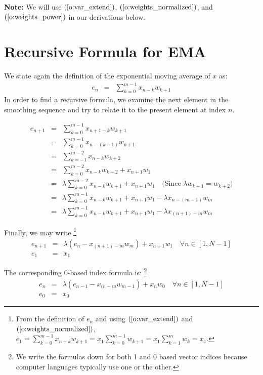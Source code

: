 \documentclass{article}
\begin{document}
{\bf Note:\/} We will use $(\ref{o:var_extend})$, $(\ref{o:weights_normalized})$,
and $(\ref{o:weights_power})$ in our derivations below.

\section{Recursive Formula for EMA}
We state again the definition of the exponential moving average of $x$ as:
\begin{eqnarray}
    e_n &=& \sum_{k=0}^{m-1} x_{n-k} w_{k+1} 
\end{eqnarray}
In order to find a recursive formula, we examine the next element in the smoothing sequence 
and try to relate it to the present element at index $n$.

\begin{eqnarray*}
    e_{n+1} &=&  \sum_{k=0}^{m-1} x_{n+1-k} w_{k+1} \\
        &=&  \sum_{k=0}^{m-1} x_{n-(k-1)} w_{k+1} \\
        &=&  \sum_{k=-1}^{m-2} x_{n-k} w_{k+2}  \\
        &=&  \sum_{k=0}^{m-2} x_{n-k} w_{k+2}  + x_{n+1} w_1 \\
        &=&  \lambda \sum_{k=0}^{m-2} x_{n-k} w_{k+1}  + x_{n+1} w_1  \quad \text{(Since $\lambda w_{k+1} = w_{k+2}$)} \\
        &=&  \lambda \sum_{k=0}^{m-1} x_{n-k} w_{k+1}  + x_{n+1} w_1  
                - \lambda x_{n-(m-1)} w_m  \\
        &=&  \lambda \sum_{k=0}^{m-1} x_{n-k} w_{k+1}  + x_{n+1} w_1  
                - \lambda x_{(n+1)-m} w_m  
\end{eqnarray*}

Finally, we may write%
\footnote{From the definition of $e_n$ and using 
$(\ref{o:var_extend})$ and $(\ref{o:weights_normalized})$,
$e_1 = \sum_{k=0}^{m-1} x_{n-k} w_{k+1} = x_1 \sum_{k=0}^{m-1} w_{k+1} = x_1 \sum_{k=1}^m w_k = x_1$.}
\begin{eqnarray}
    e_{n+1} &=&  \lambda \left(e_n - x_{(n+1) - m} w_m \right) + x_{n+1} w_1  \quad \forall n \in [1, N-1] \\
    e_1     &=&  x_1 
\end{eqnarray}

The corresponding 0-based index formula is:%
\footnote{We write the formulas down for both 1 and  0 based vector indices because
computer languages typically use one or the other.}
\begin{eqnarray}
    e_{n} &=&  \lambda \left( e_{n-1} - x_{(n-m} w_{m-1} \right) + x_{n} w_0  \quad \forall n \in [1, N-1] \\
    e_0   &=&  x_0 
\end{eqnarray}
\end{document}
